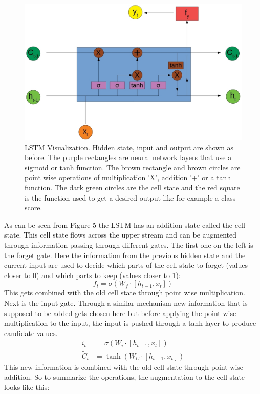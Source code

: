 \documentclass{article}
\begin{document}
\begin{figure}[H]
\begin{center}
\includegraphics[scale=0.3]{rsz_1lstm}
\end{center}
\caption{LSTM Visualization. Hidden state, input and output are shown as before. The purple rectangles are neural network layers that use a sigmoid or tanh function. The brown rectangle and brown circles are point wise operations of multiplication 'X', addition '+' or a tanh function. The dark green circles are the cell state and the red square is the function used to get a desired output like for example a class score.}
\end{figure}  
As can be seen from Figure 5 the LSTM has an addition state called the cell state. This cell state flows across the upper stream and can be augmented through information passing through different gates. The first one on the left is the forget gate. Here the information from the previous hidden state and the current input are used to decide which parts of the cell state to forget (values closer to 0) and which parts to keep (values closer to 1):
\[
f_t = \sigma(W_f\cdot[h_{t-1}, x_t])
\]
This gets combined with the old cell state through point wise multiplication.
Next is the input gate. Through a similar mechanism new information that is supposed to be added gets chosen here but before applying the point wise multiplication to the input, the input is pushed through a tanh layer to produce candidate values. 
\[
\begin{split}
i_t &= \sigma(W_i\cdot[h_{t-1}, x_t])\\
\tilde{C}_t &= \tanh(W_C\cdot[h_{t-1},x_t])
\end{split}
\]
This new information is combined with the old cell state through point wise addition. So to summarize the operations, the augmentation to the cell state looks like this:
\end{document}
